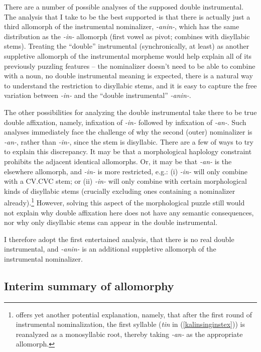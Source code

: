 \documentclass[output=paper]{langscibook}
\begin{document}
There are a number of possible analyses of the supposed double instrumental. The analysis that I take to be the best supported is that there is actually just a third allomorph of the instrumental nominalizer, \textit{-anin-}, which has the same distribution as the \textit{-in-} allomorph (first vowel as pivot; combines with disyllabic stems). Treating the ``double'' instrumental (synchronically, at least) as another suppletive allomorph of the instrumental morpheme would help explain all of its previously puzzling features -- the nominalizer doesn't need to be able to combine with a noun, no double instrumental meaning is expected, there is a natural way to understand the restriction to disyllabic stems, and it is easy to capture the free variation between \textit{-in-} and the ``double instrumental'' \textit{-anin-}.

The other possibilities for analyzing the double instrumental take there to be true double affixation, namely, infixation of \textit{-in-} followed by infixation of \textit{-an-}. Such analyses immediately face the challenge of why the second (outer)  nominalizer is \textit{-an-}, rather than \textit{-in-}, since the stem is disyllabic. There are a few of ways to try to explain this discrepancy. It may be that a morphological haplology constraint prohibits the adjacent identical allomorphs. Or, it may be that \textit{-an-} is the elsewhere allomorph, and \textit{-in-} is more restricted, e.g.: (i) \textit{-in-} will only combine with a CV.CVC stem; or (ii) \textit{-in-} will only combine with certain morphological kinds of disyllabic stems (crucially excluding ones containing a nominalizer already).\footnote{\citet[64]{Rad81} offers yet another potential explanation, namely, that after the first round of instrumental nominalization, the first syllable (\textit{tin} in (\ref{kalinsinginstex})) is reanalyzed as a monosyllabic root, thereby taking \textit{-an-} as the appropriate allomorph.}  However, solving this aspect of the morphological puzzle still would not explain why double affixation here does not have any semantic consequences, nor why only disyllabic stems can appear in the double instrumental. 

I therefore adopt the first entertained analysis, that there is no real double instrumental, and \textit{-anin-} is an additional suppletive allomorph of the instrumental nominalizer.

\subsection{Interim summary of allomorphy}\label{kalinallosec}\label{sec:kalin:3.3}
\end{document}

